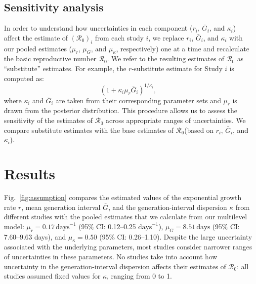 \documentclass[12pt]{article}
\newcommand{\fref}[1]{Fig.~\ref{fig:#1}}
\newcommand{\Ro}{\ensuremath{{\mathcal R}_{0}}\xspace}
\begin{document}
\subsection{Sensitivity analysis}

In order to understand how uncertainties in each component ($r_i$, $\bar G_i$, and $\kappa_i$) affect the estimate of $(\Ro)_i$ from each study $i$, we replace $r_i$, $\bar G_i$, and $\kappa_i$ with our pooled estimates ($\mu_r$, $\mu_G$, and $\mu_\kappa$, respectively) one at a time and recalculate the basic reproductive number \Ro.
We refer to the resulting estimates of \Ro as ``substitute'' estimates.
For example, the $r$-substitute estimate for Study $i$ is computed as:
\begin{equation}
\left(1 + \kappa_i \mu_r \bar{G}_i\right)^{1/\kappa_i},
\end{equation}
where $\kappa_i$ and $\bar{G}_i$ are taken from their corresponding parameter sets and $\mu_r$ is drawn from the posterior distribution.
This procedure allows us to assess the sensitivity of the estimates of \Ro across appropriate ranges of uncertainties.
We compare substitute estimates with the base estimates of \Ro (based on $r_i$, $\bar G_i$, and $\kappa_i$).

\section{Results}

\fref{assumption} compares the estimated values of the exponential growth rate $r$, mean generation interval $\bar G$, and the generation-interval dispersion $\kappa$ from different studies with the pooled estimates that we calculate from our multilevel model:
$\mu_r = 0.17\,\textrm{days}^{-1}$ (95\% CI: 0.12--0.25 $\textrm{days}^{-1}$),
$\mu_G = 8.51\,\textrm{days}$ (95\% CI: 7.60--9.63 days),
and
$\mu_\kappa = 0.50$ (95\% CI: 0.26--1.10).
Despite the large uncertainty associated with the underlying parameters,
most studies consider narrower ranges of uncertainties in these parameters.
No studies take into account how uncertainty in the generation-interval dispersion affects their estimates of \Ro:
all studies assumed fixed values for $\kappa$, ranging from 0 to 1.
\end{document}
